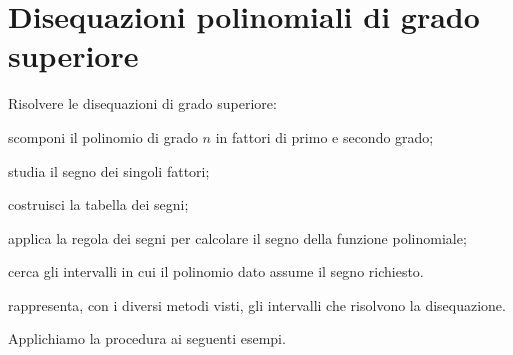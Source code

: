 %  
% 
% 

\section{Disequazioni polinomiali di grado superiore}
\label{sec:diseq_grado_superiore}

\begin{procedura}{}{}
Risolvere le disequazioni di grado superiore:
\begin{enumeratea}
\item scomponi il polinomio di grado \(n\) in fattori di primo e secondo 
grado;
\item studia il segno dei singoli fattori;
\item costruisci la tabella dei segni;
\item applica la regola dei segni per calcolare il segno della funzione 
polinomiale;
\item cerca gli intervalli in cui il polinomio dato assume il segno 
richiesto.
\item rappresenta, con i diversi metodi visti, gli intervalli che 
 risolvono la disequazione.
\end{enumeratea}
\end{procedura}

Applichiamo la procedura ai seguenti esempi.

